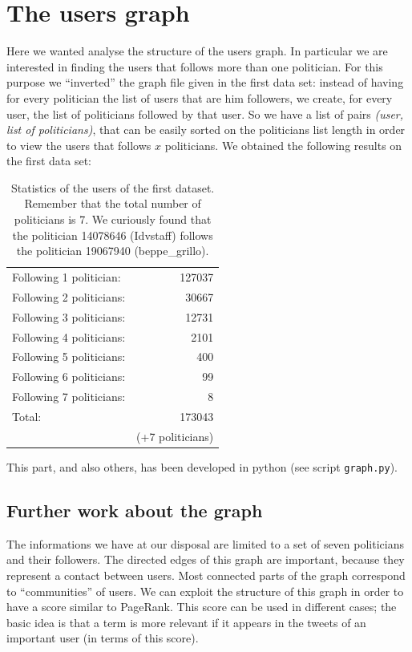 \documentclass[a4paper,11pt,oneside]{article}
\begin{document}
\section{The users graph}
\label{sec:graph}
Here we wanted analyse the structure of the users graph. In particular we are interested in finding the users that follows more than one politician. For this purpose we ``inverted'' the graph file given in the first data set: instead of having for every politician the list of users that are him followers, we create, for every user, the list of politicians followed by that user.
So we have a list of pairs \textit{(user, list of politicians)}, that can be easily sorted on the politicians list length in order to view the users that follows $x$ politicians. We obtained the following results on the first data set:

\begin{table}[h]
\begin{center}
	\begin{tabular}{l | r}
	Following 1 politician: & 127037\\ %
	Following 2 politicians: & 30667\\ %
	Following 3 politicians: & 12731\\ %
	Following 4 politicians: & 2101\\ %
	Following 5 politicians: & 400\\ %
	Following 6 politicians: & 99\\ %
	Following 7 politicians: & 8\\ \hline
	Total:	 & 173043 \\
	& (+7 politicians)\\ %
	\end{tabular}
\end{center}
\caption{Statistics of the users of the first dataset. Remember that the total number of politicians is 7. We curiously found that the politician 14078646 (Idvstaff) follows the politician 19067940 (beppe\_grillo).}
\end{table}

This part, and also others, has been developed in python (see script \texttt{graph.py}).

\subsection{Further work about the graph}
The informations we have at our disposal are limited to a set of seven politicians and their followers. The directed edges of this graph are important, because they represent a contact between users. Most connected parts of the graph correspond to ``communities'' of users. We can exploit the structure of this graph in order to have a score similar to PageRank. This score can be used in different cases; the basic idea is that a term is more relevant if it appears in the tweets of an important user (in terms of this score).
\end{document}

